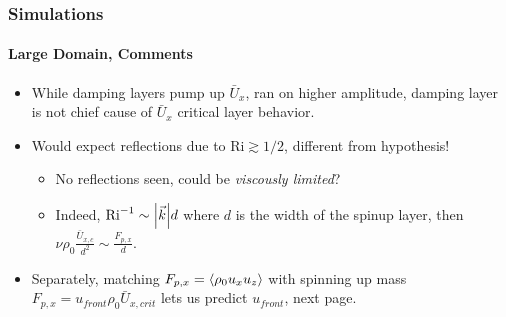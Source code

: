 \documentclass[dvipsnames, 10pt]{beamer}
\DeclarePairedDelimiter\abs{\lvert}{\rvert}
\DeclarePairedDelimiter\ev{\langle}{\rangle}
\begin{document}
\begin{frame}
    \frametitle{Simulations}
    \framesubtitle{Large Domain, Comments}

    \begin{itemize}
        \item While damping layers pump up $\bar{U}_x$, ran on higher amplitude,
            damping layer is not chief cause of $\bar{U}_x$ critical layer
            behavior. %

        \item Would expect reflections due to $\mathrm{Ri} \gtrsim 1/2$,
            different from hypothesis!
            \begin{itemize}
                \item No reflections seen, could be \emph{viscously limited}?

                \item Indeed, $\mathrm{Ri}^{-1} \sim \abs*{\vec{k}}d$ where $d$
                    is the width of the spinup layer, then $\nu \rho_0
                    \frac{\bar{U}_{x, c}}{d^2} \sim \frac{F_{p, x}}{d}$.
            \end{itemize}

        \item Separately, matching $F_{p, x} = \ev*{\rho_0 u_x u_z}$ with
            spinning up mass $F_{p, x} = u_{front} \rho_0 \bar{U}_{x, crit}$
            lets us predict $u_{front}$, next page.
    \end{itemize}
\end{frame}
\end{document}
